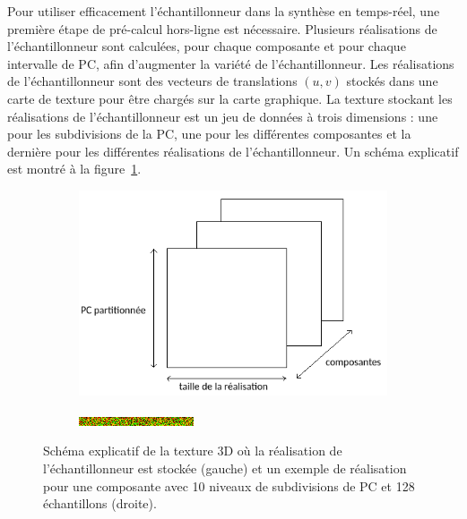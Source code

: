 \bigskip

Pour utiliser efficacement l'échantillonneur dans la synthèse en temps-réel, une première étape de pré-calcul hors-ligne est nécessaire. Plusieurs réalisations de l'échantillonneur sont calculées, pour chaque composante et pour chaque intervalle de PC, afin d'augmenter la variété de l'échantillonneur. Les réalisations de l'échantillonneur sont des vecteurs de translations $(u, v)$ stockés dans une carte de texture pour être chargés sur la carte graphique. La texture stockant les réalisations de l'échantillonneur est un jeu de données à trois dimensions : une pour les subdivisions de la PC, une pour les différentes composantes et la dernière pour les différentes réalisations de l'échantillonneur. Un schéma explicatif est montré à la figure~\ref{fig:sampler-realization}.

\begin{figure}
    \centering
    \begin{subfigure}{.5\textwidth}
        \centering
        \includegraphics[width=\textwidth]{contenu/resources/images/sampler_realization}
    \end{subfigure}
    \hfill
    \begin{subfigure}{.45\textwidth}
        \centering
        \includegraphics[width=\textwidth]{contenu/resources/images/realization_pc_0}
    \end{subfigure}

    \caption[Réalisation de l'échantillonneur préférentiel]{Schéma explicatif de la texture 3D où la réalisation de l'échantillonneur est stockée (gauche) et un exemple de réalisation pour une composante avec 10 niveaux de subdivisions de PC et 128 échantillons (droite).}
    \label{fig:sampler-realization}
\end{figure}

